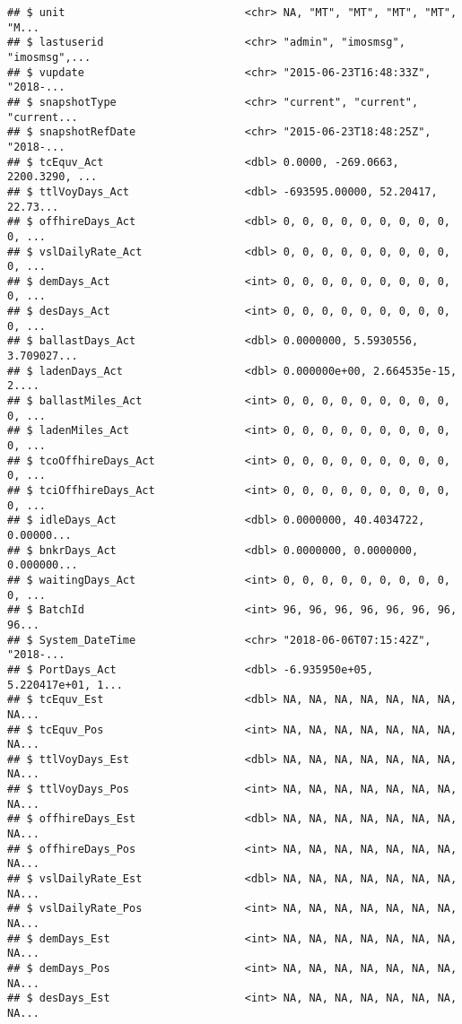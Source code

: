 \documentclass[]{article}
\begin{document}
\begin{verbatim}
## $ unit                            <chr> NA, "MT", "MT", "MT", "MT", "M...
## $ lastuserid                      <chr> "admin", "imosmsg", "imosmsg",...
## $ vupdate                         <chr> "2015-06-23T16:48:33Z", "2018-...
## $ snapshotType                    <chr> "current", "current", "current...
## $ snapshotRefDate                 <chr> "2015-06-23T18:48:25Z", "2018-...
## $ tcEquv_Act                      <dbl> 0.0000, -269.0663, 2200.3290, ...
## $ ttlVoyDays_Act                  <dbl> -693595.00000, 52.20417, 22.73...
## $ offhireDays_Act                 <dbl> 0, 0, 0, 0, 0, 0, 0, 0, 0, 0, ...
## $ vslDailyRate_Act                <dbl> 0, 0, 0, 0, 0, 0, 0, 0, 0, 0, ...
## $ demDays_Act                     <int> 0, 0, 0, 0, 0, 0, 0, 0, 0, 0, ...
## $ desDays_Act                     <int> 0, 0, 0, 0, 0, 0, 0, 0, 0, 0, ...
## $ ballastDays_Act                 <dbl> 0.0000000, 5.5930556, 3.709027...
## $ ladenDays_Act                   <dbl> 0.000000e+00, 2.664535e-15, 2....
## $ ballastMiles_Act                <int> 0, 0, 0, 0, 0, 0, 0, 0, 0, 0, ...
## $ ladenMiles_Act                  <int> 0, 0, 0, 0, 0, 0, 0, 0, 0, 0, ...
## $ tcoOffhireDays_Act              <int> 0, 0, 0, 0, 0, 0, 0, 0, 0, 0, ...
## $ tciOffhireDays_Act              <int> 0, 0, 0, 0, 0, 0, 0, 0, 0, 0, ...
## $ idleDays_Act                    <dbl> 0.0000000, 40.4034722, 0.00000...
## $ bnkrDays_Act                    <dbl> 0.0000000, 0.0000000, 0.000000...
## $ waitingDays_Act                 <int> 0, 0, 0, 0, 0, 0, 0, 0, 0, 0, ...
## $ BatchId                         <int> 96, 96, 96, 96, 96, 96, 96, 96...
## $ System_DateTime                 <chr> "2018-06-06T07:15:42Z", "2018-...
## $ PortDays_Act                    <dbl> -6.935950e+05, 5.220417e+01, 1...
## $ tcEquv_Est                      <dbl> NA, NA, NA, NA, NA, NA, NA, NA...
## $ tcEquv_Pos                      <int> NA, NA, NA, NA, NA, NA, NA, NA...
## $ ttlVoyDays_Est                  <dbl> NA, NA, NA, NA, NA, NA, NA, NA...
## $ ttlVoyDays_Pos                  <int> NA, NA, NA, NA, NA, NA, NA, NA...
## $ offhireDays_Est                 <dbl> NA, NA, NA, NA, NA, NA, NA, NA...
## $ offhireDays_Pos                 <int> NA, NA, NA, NA, NA, NA, NA, NA...
## $ vslDailyRate_Est                <dbl> NA, NA, NA, NA, NA, NA, NA, NA...
## $ vslDailyRate_Pos                <int> NA, NA, NA, NA, NA, NA, NA, NA...
## $ demDays_Est                     <int> NA, NA, NA, NA, NA, NA, NA, NA...
## $ demDays_Pos                     <int> NA, NA, NA, NA, NA, NA, NA, NA...
## $ desDays_Est                     <int> NA, NA, NA, NA, NA, NA, NA, NA...

\end{verbatim}
\end{document}
